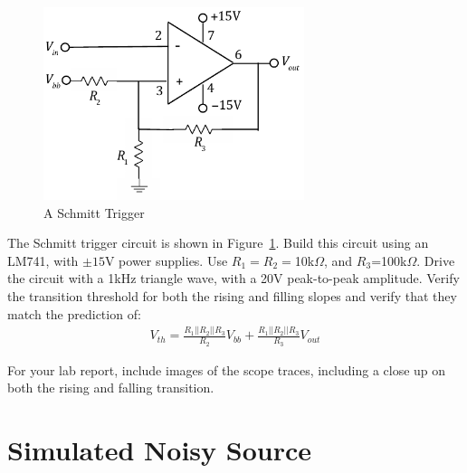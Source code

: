 \documentclass[12pt]{article}
\begin{document}
\begin{figure}[!h]
\centerline{\includegraphics[width=3in]{figs/schmitt.pdf}}
\caption{A Schmitt Trigger}
\label{fig:schmitt}
\end{figure}

The Schmitt trigger circuit is shown in Figure~\ref{fig:schmitt}. Build this circuit using an LM741, with $\pm 15$V power supplies. Use $R_1=R_2=$10k$\Omega$, and $R_3$=100k$\Omega$.  Drive the circuit with a 1kHz triangle wave, with a 20V peak-to-peak amplitude.  Verify the transition threshold
for both the rising and filling slopes and verify that they match the prediction of:
\begin{align*}
V_{th}=\frac{R_1||R_2||R_3}{R_2}V_{bb}+\frac{R_1||R_2||R_3}{R_3}V_{out}
\end{align*}

For your lab report, include images of the scope traces, including a close up on both the rising and falling transition.

\section*{Simulated Noisy Source}
\end{document}
